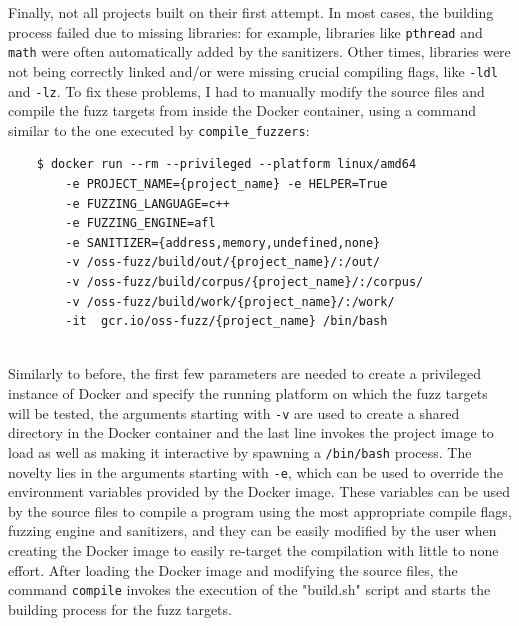 \newpage
Finally, not all projects built on their first attempt.
\newline \newline
In most cases, the building process failed due to missing libraries: for example, libraries like \verb|pthread| and \verb|math| were often automatically added by the sanitizers.
\newline
Other times, libraries were not being correctly linked and/or were missing crucial compiling flags, like \verb|-ldl| and \verb|-lz|.
\newline \newline
To fix these problems, I had to manually modify the source files and compile the fuzz targets from inside the Docker container, using a command similar to the one executed by \verb|compile_fuzzers|:
\begin{verbatim}
    $ docker run --rm --privileged --platform linux/amd64 
        -e PROJECT_NAME={project_name} -e HELPER=True 
        -e FUZZING_LANGUAGE=c++ 
        -e FUZZING_ENGINE=afl 
        -e SANITIZER={address,memory,undefined,none} 
        -v /oss-fuzz/build/out/{project_name}/:/out/
        -v /oss-fuzz/build/corpus/{project_name}/:/corpus/    
        -v /oss-fuzz/build/work/{project_name}/:/work/
        -it  gcr.io/oss-fuzz/{project_name} /bin/bash
\end{verbatim}
\ \\
Similarly to before, the first few parameters are needed to create a privileged instance of Docker and specify the running platform on which the fuzz targets will be tested, the arguments starting with \verb|-v| are used to create a shared directory in the Docker container and the last line invokes the project image to load as well as making it interactive by spawning a \verb|/bin/bash| process.
\newline \newline
The novelty lies in the arguments starting with \verb|-e|, which can be used to override the environment variables provided by the Docker image.
\newline
These variables can be used by the source files to compile a program using the most appropriate compile flags, fuzzing engine and sanitizers, and they can be easily modified by the user when creating the Docker image to easily re-target the compilation with little to none effort.
\newline \newline
After loading the Docker image and modifying the source files, the command \verb|compile| invokes the execution of the "build.sh" script and starts the building process for the fuzz targets.




